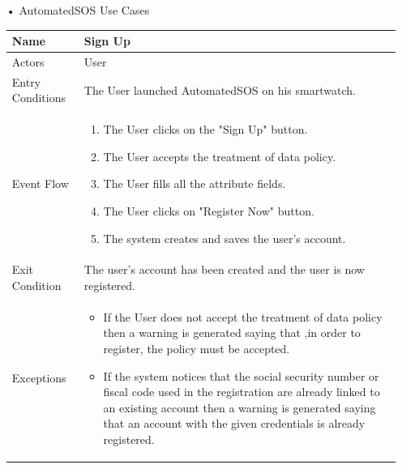 \begin{enumerate}
\item[•]{\Large AutomatedSOS Use Cases}
\FloatBarrier
\begin{table}[h]
\begin{tabular}{|l|p{}|}
\hline
Name             & Sign Up \\ \hline
Actors           & User  \\ \hline
Entry Conditions & The User launched AutomatedSOS on his smartwatch.    \\ \hline
Event Flow       & \begin{enumerate}
            \item The User clicks on the "Sign Up" button.
            \item The User accepts the treatment of data policy.
            \item The User fills all the attribute fields.
            \item The User clicks on "Register Now" button.
            \item The system creates and saves the user's account.
        \end{enumerate}\\ \hline
Exit Condition   & The user's account has been created and the user is now registered.\\ \hline
Exceptions       & \begin{itemize}
\item If the User does not accept the treatment of data policy then a warning is generated saying that ,in order to register, the policy must be accepted.
\item If the system notices that the social security number or fiscal code used in the registration are already linked to an existing account then a warning is generated saying that an account with the given credentials is already registered.
\end{itemize}\\ \hline
\end{tabular}
\end{table}
\FloatBarrier


\end{enumerate}
